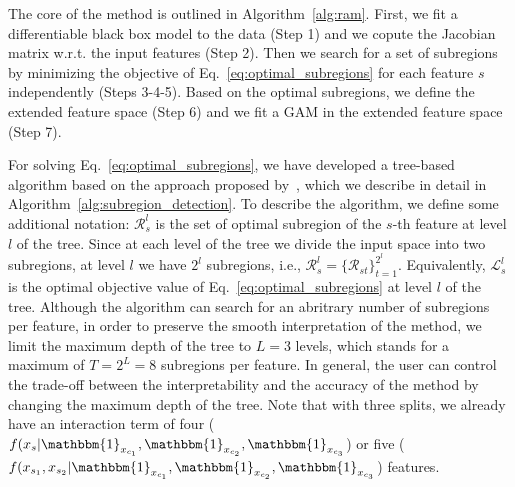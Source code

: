 \documentclass[runningheads]{llncs}
\newcommand{\when}[1]{\mathbbm{1}_{#1}}
\begin{document}
The core of the method is outlined in Algorithm~\ref{alg:ram}.
First, we fit a differentiable black box model to the data (Step 1) and we copute the Jacobian matrix w.r.t. the input features (Step 2).
Then we search for a set of subregions by minimizing the objective of Eq.~\eqref{eq:optimal_subregions}
for each feature $s$ independently (Steps 3-4-5).
Based on the optimal subregions, we define the extended feature space (Step 6) and we fit a GAM in the extended feature space (Step 7).

For solving Eq.~\eqref{eq:optimal_subregions}, we have developed a tree-based algorithm
based on the approach proposed by~\citep{herbinger2023decomposing}, which we describe in detail in Algorithm~\ref{alg:subregion_detection}.
To describe the algorithm, we define some additional notation: $\mathcal{R}_s^l$ is the set of optimal subregion of the $s$-th feature at level $l$ of the tree.
Since at each level of the tree we divide the input space into two subregions, at level $l$ we have $2^l$ subregions,
i.e., $\mathcal{R}_s^l = \{\mathcal{R}_{st}\}_{t=1}^{2^l}$.
Equivalently, $\mathcal{L}_s^l$ is the optimal objective value of Eq.~\eqref{eq:optimal_subregions} at level $l$ of the tree.
Although the algorithm can search for an abritrary number of subregions per feature,
in order to preserve the smooth interpretation of the method,
we limit the maximum depth of the tree to $L=3$ levels,
which stands for a maximum of $T = 2^L = 8$ subregions per feature.
In general, the user can control the trade-off between the interpretability and the accuracy of the method by changing the maximum depth of the tree.
Note that with three splits, we already have an interaction term of
four ($f(x_s | \when{x_{c_1}}, \when{x_{c_2}}, \when{x_{c_3}}$) or
five ($f(x_{s_1}, x_{s_{2}} | \when{x_{c_1}}, \when{x_{c_2}}, \when{x_{c_3}}$) features.
\end{document}

